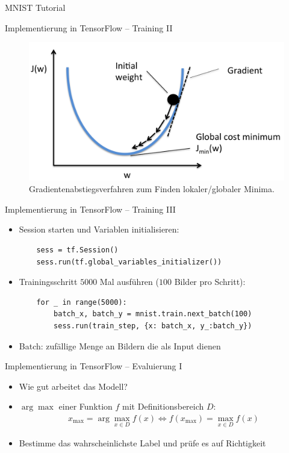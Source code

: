 \documentclass[utf8, smaller, c]{beamer}
\begin{document}
\begin{frame}{MNIST Tutorial}
	\begin{block}{Implementierung in TensorFlow -- Training II}
		\begin{figure}[c]
		\includegraphics[scale=0.1]{pics/gradient_descent}
		\caption{Gradientenabstiegsverfahren zum Finden lokaler/globaler Minima.}
		\end{figure}
	\end{block}
	
	\begin{block}{Implementierung in TensorFlow -- Training III}
		\begin{itemize}
			\item Session starten und Variablen initialisieren:
			\begin{lstlisting}
	sess = tf.Session()
	sess.run(tf.global_variables_initializer())
			\end{lstlisting}
			\item Trainingsschritt $5000$ Mal ausführen ($100$ Bilder pro Schritt):
			\begin{lstlisting}
	for _ in range(5000):
		batch_x, batch_y = mnist.train.next_batch(100)
		sess.run(train_step, {x: batch_x, y_:batch_y})
			\end{lstlisting}
			\item Batch: zufällige Menge an Bildern die als Input dienen
		\end{itemize}
	\end{block}
	
	\framebreak
	
	\begin{block}{Implementierung in TensorFlow -- Evaluierung I}
		\begin{itemize}
			\item Wie gut arbeitet das Modell? 
			\item $\arg\max$ einer Funktion $f$ mit Definitionsbereich $D$:
			\begin{align*}
				x_{\max} = \arg\max_{x\in D} f(x)\Leftrightarrow f(x_{\max}) = \max_{x\in D}f(x)
			\end{align*}
			\item Bestimme das wahrscheinlichste Label und prüfe es auf Richtigkeit
		

\end{itemize}
\end{block}
\end{frame}
\end{document}

